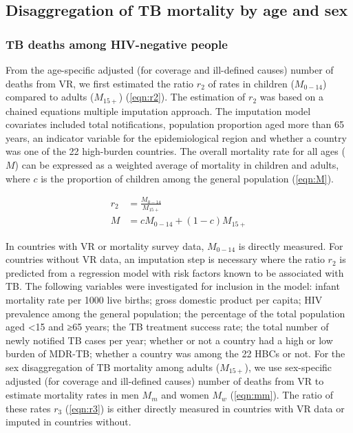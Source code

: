 \subsection{Disaggregation of TB mortality by age and sex}

\subsubsection{TB deaths among HIV-negative people}

From the age-specific adjusted (for coverage and ill-defined causes) number of deaths from VR, we first estimated the ratio $r_2$ of rates in children ($M_{0-14}$) compared to adults ($M_{15+}$) (\ref{eqn:r2}). The estimation of $r_2$ was based on a chained equations multiple imputation approach. The  imputation model covariates included total notifications, population proportion aged more than 65 years, an indicator variable for the epidemiological  region and whether a country was one of the 22 high-burden countries. The overall mortality rate for all ages ($M$) can be expressed as a weighted average of mortality in children and adults, where $c$ is the proportion of children among the general population (\ref{eqn:M}).


\begin{align}
r_2 &= \frac{M_{0-14}}{M_{15+}} \label{eqn:r2} \\
M &= c M_{0-14} + (1 - c) M_{15+} \label{eqn:M}
\end{align}


In countries with VR or mortality survey data, $M_{0-14}$ is directly measured. For countries without VR data, an imputation step is necessary where the ratio $r_2$ is predicted from a regression model with risk factors known to be associated with TB. The following variables were investigated for inclusion in the model: infant mortality rate per 1000 live births; gross domestic product per capita; HIV prevalence among the general population; the percentage of the total population aged <15 and ≥65 years; the TB treatment suc­cess rate; the total number of newly notified TB cases per year; whether or not a country had a high or low burden of MDR-TB; whether a country was among the 22 HBCs or not. For the sex disaggregation of TB mortality among adults ($M_{15+}$), we use sex-specific adjusted (for coverage and ill-defined causes) number of deaths from VR to estimate mortality rates in men $M_m$  and women $M_w$ (\ref{eqn:mm}). The ratio of these rates $r_3$ (\ref{eqn:r3}) is either directly measured in countries with VR data or imputed in countries without.



